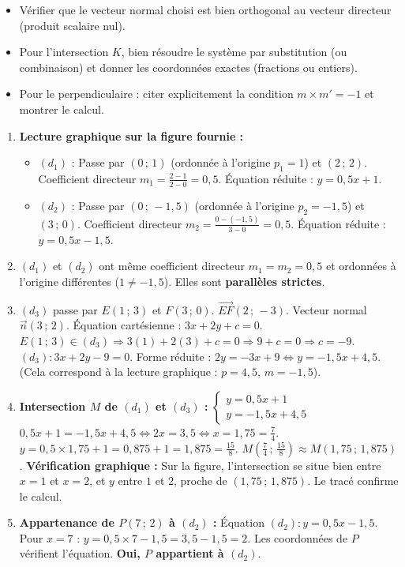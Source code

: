 \documentclass[11pt]{article}
\begin{document}
\begin{attention}
\begin{itemize}
\item Vérifier que le vecteur normal choisi est bien orthogonal au vecteur directeur (produit scalaire nul).
\item Pour l'intersection $K$, bien résoudre le système par substitution (ou combinaison) et donner les coordonnées exactes (fractions ou entiers).
\item Pour le perpendiculaire : citer explicitement la condition $m \times m' = -1$ et montrer le calcul.
\end{itemize}
\end{attention}

\begin{corrige}
\begin{enumerate}
\item \textbf{Lecture graphique sur la figure fournie :}
\begin{itemize}
\item $(d_1)$ : Passe par $(0\,;\,1)$ (ordonnée à l'origine $p_1=1$) et $(2\,;\,2)$. Coefficient directeur $m_1 = \frac{2-1}{2-0} = 0,5$.
Équation réduite : $\boxed{y = 0,5x + 1}$.
\item $(d_2)$ : Passe par $(0\,;\,-1,5)$ (ordonnée à l'origine $p_2=-1,5$) et $(3\,;\,0)$. Coefficient directeur $m_2 = \frac{0-(-1,5)}{3-0} = 0,5$.
Équation réduite : $\boxed{y = 0,5x - 1,5}$.
\end{itemize}
\item $(d_1)$ et $(d_2)$ ont même coefficient directeur $m_1 = m_2 = 0,5$ et ordonnées à l'origine différentes ($1 \neq -1,5$).
\Rightarrow Elles sont \textbf{parallèles strictes}.
\item $(d_3)$ passe par $E(1\,;\,3)$ et $F(3\,;\,0)$.
$\overrightarrow{EF}(2\,;\,-3)$. Vecteur normal $\vec{n}(3\,;\,2)$.
Équation cartésienne : $3x + 2y + c = 0$. $E(1\,;\,3) \in (d_3) \Rightarrow 3(1) + 2(3) + c = 0 \Rightarrow 9 + c = 0 \Rightarrow c = -9$.
$\boxed{(d_3) : 3x + 2y - 9 = 0}$.
Forme réduite : $2y = -3x + 9 \iff \boxed{y = -1,5x + 4,5}$.
(Cela correspond à la lecture graphique : $p=4,5$, $m=-1,5$).
\item \textbf{Intersection $M$ de $(d_1)$ et $(d_3)$ :}
$\begin{cases} y = 0,5x + 1 \\ y = -1,5x + 4,5 \end{cases}$
$0,5x + 1 = -1,5x + 4,5 \iff 2x = 3,5 \iff x = 1,75 = \frac{7}{4}$.
$y = 0,5 \times 1,75 + 1 = 0,875 + 1 = 1,875 = \frac{15}{8}$.
$\boxed{M\left(\frac{7}{4}\,;\,\frac{15}{8}\right)} \approx M(1,75\,;\,1,875)$.
\textbf{Vérification graphique :} Sur la figure, l'intersection se situe bien entre $x=1$ et $x=2$, et $y$ entre $1$ et $2$, proche de $(1,75\,;\,1,875)$. Le tracé confirme le calcul.
\item \textbf{Appartenance de $P(7\,;\,2)$ à $(d_2)$ :}
Équation $(d_2) : y = 0,5x - 1,5$.
Pour $x=7$ : $y = 0,5 \times 7 - 1,5 = 3,5 - 1,5 = 2$.
Les coordonnées de $P$ vérifient l'équation.
\Rightarrow \textbf{Oui, $P$ appartient à $(d_2)$}.
\end{enumerate}
\end{corrige}
\end{document}
